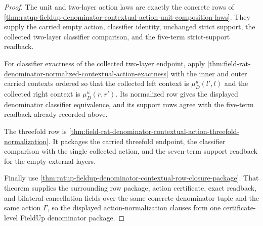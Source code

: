\begin{proof}
The unit and two-layer action laws are exactly the concrete rows of
\autoref{thm:ratup-fieldup-denominator-contextual-action-unit-composition-laws}.
They supply the carried empty action, classifier identity, unchanged strict
support, the collected two-layer classifier comparison, and the five-term
strict-support readback.

For classifier exactness of the collected two-layer endpoint, apply
\autoref{thm:field-rat-denominator-normalized-contextual-action-exactness} with
the inner and outer carried contexts ordered so that the collected left context is
$\mu_D^u(l',l)$ and the collected right context is $\mu_D^u(r,r')$. Its
normalized row gives the displayed denominator classifier equivalence, and its
support rows agree with the five-term readback already recorded above.

The threefold row is
\autoref{thm:field-rat-denominator-contextual-action-threefold-normalization}.
It packages the carried threefold endpoint, the classifier comparison with the
single collected action, and the seven-term support readback for the empty
external layers.

Finally use
\autoref{thm:ratup-fieldup-denominator-contextual-row-closure-package}. That
theorem supplies the surrounding row package, action certificate, exact readback,
and bilateral cancellation fields over the same concrete denominator tuple and
the same action $\Gamma$, so the displayed action-normalization clauses form one
certificate-level FieldUp denominator package.
\end{proof}

